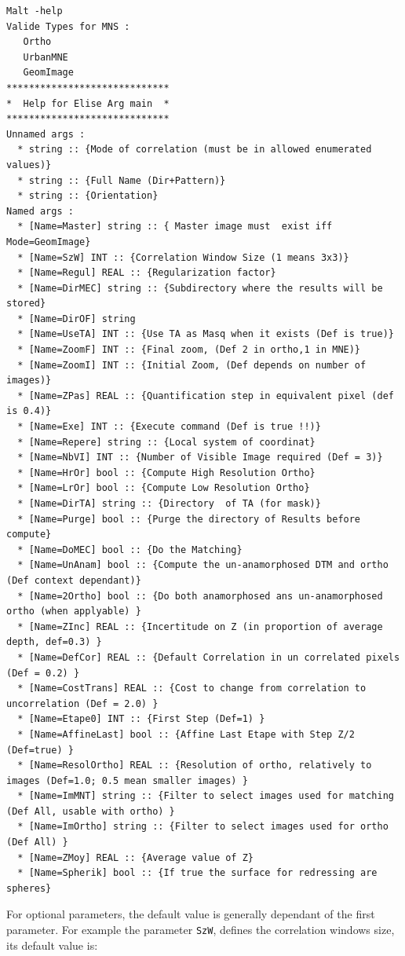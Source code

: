 {\scriptsize
\begin{verbatim}
Malt -help
Valide Types for MNS : 
   Ortho
   UrbanMNE
   GeomImage
*****************************
*  Help for Elise Arg main  *
*****************************
Unnamed args : 
  * string :: {Mode of correlation (must be in allowed enumerated values)}
  * string :: {Full Name (Dir+Pattern)}
  * string :: {Orientation}
Named args : 
  * [Name=Master] string :: { Master image must  exist iff Mode=GeomImage}
  * [Name=SzW] INT :: {Correlation Window Size (1 means 3x3)}
  * [Name=Regul] REAL :: {Regularization factor}
  * [Name=DirMEC] string :: {Subdirectory where the results will be stored}
  * [Name=DirOF] string
  * [Name=UseTA] INT :: {Use TA as Masq when it exists (Def is true)}
  * [Name=ZoomF] INT :: {Final zoom, (Def 2 in ortho,1 in MNE)}
  * [Name=ZoomI] INT :: {Initial Zoom, (Def depends on number of images)}
  * [Name=ZPas] REAL :: {Quantification step in equivalent pixel (def is 0.4)}
  * [Name=Exe] INT :: {Execute command (Def is true !!)}
  * [Name=Repere] string :: {Local system of coordinat}
  * [Name=NbVI] INT :: {Number of Visible Image required (Def = 3)}
  * [Name=HrOr] bool :: {Compute High Resolution Ortho}
  * [Name=LrOr] bool :: {Compute Low Resolution Ortho}
  * [Name=DirTA] string :: {Directory  of TA (for mask)}
  * [Name=Purge] bool :: {Purge the directory of Results before compute}
  * [Name=DoMEC] bool :: {Do the Matching}
  * [Name=UnAnam] bool :: {Compute the un-anamorphosed DTM and ortho (Def context dependant)}
  * [Name=2Ortho] bool :: {Do both anamorphosed ans un-anamorphosed ortho (when applyable) }
  * [Name=ZInc] REAL :: {Incertitude on Z (in proportion of average depth, def=0.3) }
  * [Name=DefCor] REAL :: {Default Correlation in un correlated pixels (Def = 0.2) }
  * [Name=CostTrans] REAL :: {Cost to change from correlation to uncorrelation (Def = 2.0) }
  * [Name=Etape0] INT :: {First Step (Def=1) }
  * [Name=AffineLast] bool :: {Affine Last Etape with Step Z/2 (Def=true) }
  * [Name=ResolOrtho] REAL :: {Resolution of ortho, relatively to images (Def=1.0; 0.5 mean smaller images) }
  * [Name=ImMNT] string :: {Filter to select images used for matching (Def All, usable with ortho) }
  * [Name=ImOrtho] string :: {Filter to select images used for ortho (Def All) }
  * [Name=ZMoy] REAL :: {Average value of Z}
  * [Name=Spherik] bool :: {If true the surface for redressing are spheres}
\end{verbatim}
}

For  optional parameters, the default value is generally dependant of the first
parameter. For example the parameter {\tt SzW}, defines the correlation
windows size, its default value is:


